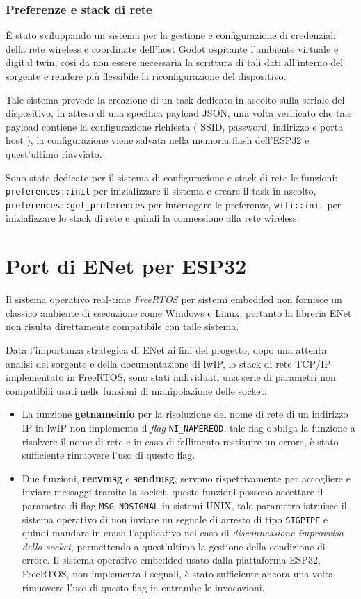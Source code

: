 \subsubsection*{Preferenze e stack di rete}
È stato sviluppando un sistema per la gestione e configurazione di credenziali della rete wireless e coordinate dell'host Godot ospitante l'ambiente virtuale e digital twin, così da non essere necessaria la scrittura di tali dati all'interno del sorgente e rendere più flessibile la riconfigurazione del dispositivo.

Tale sistema prevede la creazione di un task dedicato in ascolto sulla seriale del dispositivo, in attesa di una specifica payload JSON, una volta verificato che tale payload contiene la configurazione richiesta ( SSID, password, indirizzo e porta host ), la configurazione viene salvata nella memoria flash dell'ESP32 e quest'ultimo riavviato.

Sono state dedicate per il sistema di configurazione e stack di rete le funzioni: \verb|preferences::init| per inizializzare il sistema e creare il task in ascolto, \verb|preferences::get_preferences| per interrogare le preferenze, \verb|wifi::init| per inizializzare lo stack di rete e quindi la connessione alla rete wireless.

\section{Port di ENet per ESP32}
Il sistema operativo real-time \textit{FreeRTOS} per sistemi embedded non fornisce un classico ambiente di esecuzione come Windows e Linux, pertanto la libreria ENet non risulta direttamente compatibile con taile sistema.

Data l'importanza strategica di ENet ai fini del progetto, dopo una attenta analisi del sorgente e della documentazione di lwIP, lo stack di rete TCP/IP implementato in FreeRTOS, sono stati individuati una serie di parametri non compatibili usati nelle funzioni di manipolazione delle socket:
\begin{itemize}
	\item La funzione \textbf{getnameinfo} per la risoluzione del nome di rete di un indirizzo IP in lwIP non implementa il \textit{flag} \verb|NI_NAMEREQD|, tale flag obbliga la funzione a risolvere il nome di rete e in caso di fallimento restituire un errore, è stato sufficiente rimuovere l'uso di questo flag.
	\item Due funzioni, \textbf{recvmsg} e \textbf{sendmsg}, servono rispettivamente per accogliere e inviare messaggi tramite la socket, queste funzioni possono accettare il parametro di flag \verb|MSG_NOSIGNAL| in sistemi UNIX, tale parametro istruisce il sistema operativo di non inviare un segnale di arresto di tipo \verb|SIGPIPE| e quindi mandare in crash l'applicativo nel caso di \textit{disconnessione improvvisa della socket}, permettendo a quest'ultimo la gestione della condizione di errore. Il sistema operativo embedded usato dalla piattaforma ESP32, FreeRTOS, non implementa i segnali, è stato sufficiente ancora una volta rimuovere l'uso di questo flag in entrambe le invocazioni.
\end{itemize}

